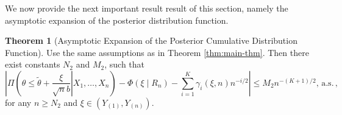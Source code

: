 \documentclass[oneside,english]{amsbook}
\numberwithin{section}{chapter}
\numberwithin{equation}{section}
\numberwithin{figure}{section}
\theoremstyle{plain}
\theoremstyle{plain}
\theoremstyle{definition}
\theoremstyle{plain}
\theoremstyle{plain}
\theoremstyle{remark}
\theoremstyle{definition}
\newtheorem{theorem}{Theorem}
\theoremstyle{definition}
\newcommand{\ascv}{\,\mathrm{a.s.}\,}
\begin{document}
We now provide the next important result result of this section, namely the asymptotic
expansion of the posterior distribution function.
\begin{theorem}[Asymptotic Expansion of the Posterior Cumulative Distribution Function]
\label{thm:asym-exp-post-cdf} Use the same assumptions as in Theorem
\ref{thm:main-thm}. Then there exist constants $N_{2}$ and $M_{2}$,
such that 
\begin{equation}
\left|\Pi\left(\left.\theta\le\tilde{\theta}+\frac{\xi}{\sqrt{n}b}\right|X_{1},\ldots,X_{n}\right)-\Phi\left(\xi\mid R_{n}\right)-\sum_{i=1}^{K}\gamma_{i}\left(\xi,n\right)n^{-i/2}\right|\le M_{2}n^{-\left(K+1\right)/2},\ascv,\label{eq:asym-exp-post-prob}
\end{equation}
for any $n\ge N_{2}$ and $\xi\in\left(Y_{\left(1\right)},Y_{\left(n\right)}\right)$. \end{theorem}
\end{document}
